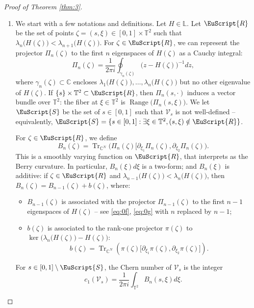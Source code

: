 \documentclass[10pt]{amsart}
\let\pazocal\EuScript
\let\sep:
\theoremstyle{definition}
\DeclareMathOperator{\Range}{Range}
\DeclareMathOperator{\Tr}{Tr}
\newcommand{\RRR}{\pazocal{R}}
\newcommand{\SSS}{{\pazocal{S}}}
\newcommand{\VVV}{{\mathscr{V}}}
\newcommand{\C}{\mathbb{C}}
\newcommand{\Ll}{\mathbb{L}}
\newcommand{\Tt}{{\mathbb{T}}}
\let\p\partial
\providecommand{\skpt}{\par\smallskip\noindent}
\begin{document}
\skpt
\begin{proof}[Proof of Theorem \ref{thm:3}]
\begin{enumerate}
\item
We start with a few notations and definitions. Let $H \in \Ll$. Let $\RRR$ be the set of points $\zeta = (s,\xi) \in [0,1] \times \Tt^2$ such that $\lambda_n\bigl( H(\zeta) \bigr) < \lambda_{n+1}\bigl(H(\zeta)\bigr)$. For $\zeta \in \RRR$, we can represent the projector $\Pi_n(\zeta)$ to the first $n$ eigenspaces of $H(\zeta)$ as a Cauchy integral:
\begin{equation}\label{eq:0f}
\Pi_n(\zeta) =
\dfrac{1}{2\pi i}\oint_{\gamma_n(\zeta)} \bigl( z - H(\zeta) \bigr)^{-1} dz,
\end{equation}
where $\gamma_n(\zeta) \subset \C$ encloses $\lambda_1\bigl( H(\zeta) \bigr), \dots, \lambda_n\bigl( H(\zeta) \bigr)$ but no other eigenvalue of $H(\zeta)$. If $\{s \} \times \Tt^2 \subset \RRR$, then $\Pi_n(s,\cdot)$ induces a vector bundle over $\Tt^2$: the fiber at $\xi \in \Tt^2$ is $\Range\bigl( \Pi_n(s,\xi)\bigr)$. We let $\SSS$ be the set of $s \in [0,1]$ such that $\VVV_s$ is not well-defined -- equivalently, $\SSS = \{s \in [0,1]\sep\exists \xi \in \Tt^2, (s,\xi) \notin \RRR\}$.

For $\zeta \in \RRR$, we define
\begin{equation}\label{eq:0g}
B_n(\zeta) = \Tr_{\C^N} \bigl( \Pi_n(\zeta) \bigl[ \p_{\xi_1} \Pi_n(\zeta), \p_{\xi_2} \Pi_n(\zeta) \bigr).
\end{equation}
This is a smoothly varying function on $\RRR$, that interprets as the Berry curvature. In particular, $B_n(\xi)d\xi$ is a two-form; and $B_n(\xi)$ is additive: if $\zeta \in \RRR$ and $\lambda_{n-1}\bigl( H(\zeta) \bigr) < \lambda_n\bigl(H(\zeta)\bigr)$, then $B_n(\zeta) = B_{n-1}(\zeta) + b(\zeta)$, where:
\begin{itemize}
\item $B_{n-1}(\zeta)$ is associated with the projector $\Pi_{n-1}(\zeta)$ to the first $n-1$ eigenspaces of $H(\zeta)$ -- see \eqref{eq:0f}, \eqref{eq:0g} with $n$ replaced by $n-1$;
\item $b(\zeta)$ is associated to the rank-one projector $\pi(\zeta)$ to $\ker\bigl( \lambda_n \bigl(H(\zeta)\bigr) - H(\zeta) \bigr)$:
\begin{equation}\label{eq:0y}
b(\zeta) = \Tr_{\C^N} \left( \pi(\zeta) \bigl[ \p_{\xi_1} \pi(\zeta), \p_{\xi_2} \pi(\zeta) \bigr]\right).
\end{equation}
\end{itemize}
For $s \in [0,1] \setminus \SSS$, the Chern number of $\VVV_s$ is the integer
\begin{equation*}
c_1(\VVV_s) = \dfrac{1}{2\pi i} \int_{\Tt^2} B_n(s,\xi) d\xi.
\end{equation*}


\end{enumerate}
\end{proof}
\end{document}
